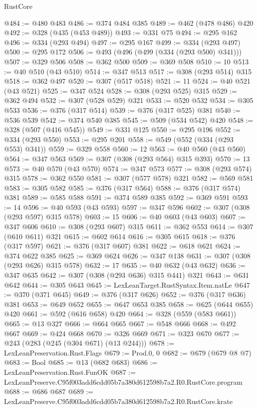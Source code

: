 \begin{lexlean}{RustCore}
\begin{coremodule}
@484 := @480 @483
@486 := @374 @484 @385
@489 := @462 (@478 @486) @420
@492 := @328 (@435 (@453 @489))
@493 := @331 @75
@494 := @295 @162
@496 := @334 (@293 @494)
@497 := @295 @167
@499 := @334 (@293 @497)
@500 := @295 @172
@506 := @493 (@496 (@499 (@334 (@293 @500) @341)))
@507 := @329 @506
@508 := @362 @500
@509 := @369 @508
@510 := 10
@513 := @40 @510 (@43 @510)
@514 := @347 @513
@517 := @308 (@293 @514) @315
@518 := @362 @497
@520 := @307 (@517 @518)
@521 := 11
@524 := @40 @521 (@43 @521)
@525 := @347 @524
@528 := @308 (@293 @525) @315
@529 := @362 @494
@532 := @307 (@528 @529) @321
@533 := @520 @532
@534 := @305 @533
@536 := @376 (@317 @514)
@539 := @376 (@317 @525) @381
@540 := @536 @539
@542 := @374 @540 @385
@545 := @509 (@534 @542) @420
@548 := @328 (@507 (@416 @545))
@549 := @331 @125
@550 := @295 @196
@552 := @334 (@293 @550)
@553 := @295 @201
@558 := @549 (@552 (@334 (@293 @553) @341))
@559 := @329 @558
@560 := 12
@563 := @40 @560 (@43 @560)
@564 := @347 @563
@569 := @307 (@308 (@293 @564) @315 @393)
@570 := 13
@573 := @40 @570 (@43 @570)
@574 := @347 @573
@577 := @308 (@293 @574) @315
@578 := @362 @550
@581 := @307 (@577 @578) @321
@582 := @569 @581
@583 := @305 @582
@585 := @376 (@317 @564)
@588 := @376 (@317 @574) @381
@589 := @585 @588
@591 := @374 @589 @385
@592 := @369 @591
@593 := 14
@596 := @40 @593 (@43 @593)
@597 := @347 @596
@602 := @307 (@308 (@293 @597) @315 @578)
@603 := 15
@606 := @40 @603 (@43 @603)
@607 := @347 @606
@610 := @308 (@293 @607) @315
@611 := @362 @553
@614 := @307 (@610 @611) @321
@615 := @602 @614
@616 := @305 @615
@618 := @376 (@317 @597)
@621 := @376 (@317 @607) @381
@622 := @618 @621
@624 := @374 @622 @385
@625 := @369 @624
@626 := @347 @138
@631 := @307 (@308 (@293 @626) @315 @578)
@632 := 17
@635 := @40 @632 (@43 @632)
@636 := @347 @635
@642 := @307 (@308 (@293 @636) @315 @441) @321
@643 := @631 @642
@644 := @305 @643
@645 := LexLeanTarget.RustSyntax.Item.natLe
@647 := @370 (@371 @645)
@649 := @376 (@317 @626)
@652 := @376 (@317 @636) @381
@653 := @649 @652
@655 := @647 @653 @385
@658 := @625 (@644 @655) @420
@661 := @592 (@616 @658) @420
@664 := @328 (@559 (@583 @661))
@665 := @13 @327
@666 := @664 @665
@667 := @548 @666
@668 := @492 @667
@669 := @424 @668
@670 := @326 @669
@671 := @323 @670
@677 := @243 (@283 (@245 (@304 @671) (@13 @244)))
@678 := LexLeanPreservation.Rust.Flags
@679 := Prod.{0, 0}
@682 := @679 (@679 @8 @7)
@683 := Bool
@685 := @13 (@682 @683)
@686 := LexLeanPreservation.Rust.FunOK
@687 := LexLeanPreserve.C95f003add6cdd05b7a380d612598b7a2.R0.RustCore.program
@688 := @686 @687
@689 := LexLeanPreserve.C95f003add6cdd05b7a380d612598b7a2.R0.RustCore.krate

\end{coremodule}
\end{lexlean}
